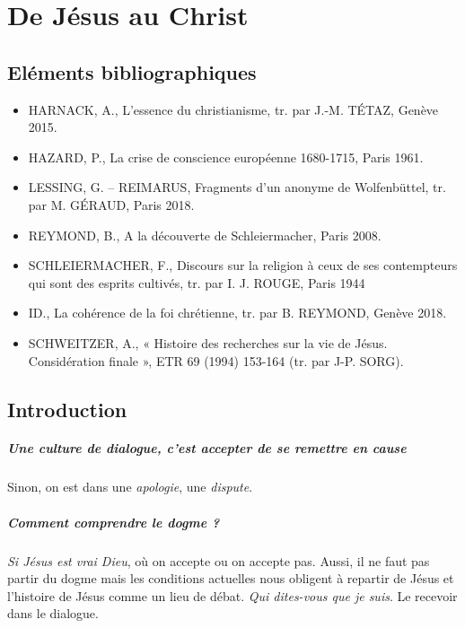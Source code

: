 \chapter{De Jésus au Christ}

\section{Eléments bibliographiques}
\begin{itemize}
    \item HARNACK, A., L’essence du christianisme, tr. par J.-M. TÉTAZ, Genève 2015.
    \item HAZARD, P., La crise de conscience européenne 1680-1715, Paris 1961.
    \item LESSING, G. – REIMARUS, Fragments d’un anonyme de Wolfenbüttel, tr. par M. GÉRAUD,
Paris 2018.
    \item REYMOND, B., A la découverte de Schleiermacher, Paris 2008.
    \item SCHLEIERMACHER, F., Discours sur la religion à ceux de ses contempteurs qui sont des
esprits cultivés, tr. par I. J. ROUGE, Paris 1944
    \item ID., La cohérence de la foi chrétienne, tr. par B. REYMOND, Genève 2018.
    \item SCHWEITZER, A., « Histoire des recherches sur la vie de Jésus. Considération finale », ETR
69 (1994) 153-164 (tr. par J-P. SORG).
\end{itemize}

\section{Introduction}

\paragraph{Une culture de dialogue, c'est accepter de se remettre en cause} Sinon, on est dans une \textit{apologie}, une \textit{dispute}. 

\paragraph{Comment comprendre le dogme ?} \textit{Si Jésus est vrai Dieu}, où on accepte ou on accepte pas.  Aussi, il ne faut pas partir du dogme mais les conditions actuelles nous obligent à repartir de Jésus et l'histoire de Jésus comme un lieu de débat. \textit{Qui dites-vous que je suis}. Le recevoir dans le dialogue.

